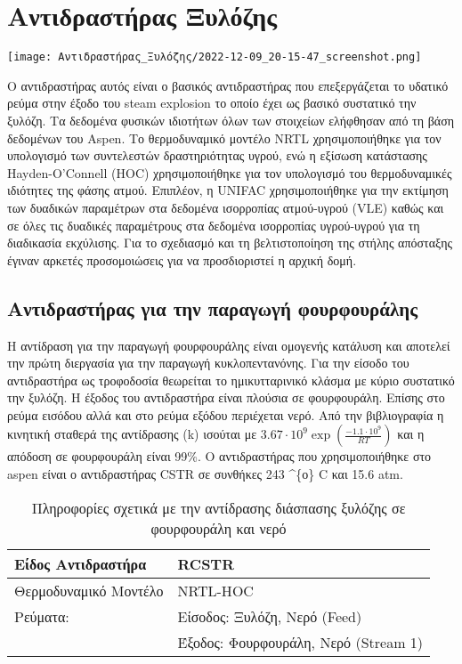 \documentclass[11pt]{article}
\begin{document}
\section{Αντιδραστήρας Ξυλόζης}
\label{sec:orgfaee438}
\begin{center}
\texttt{[image: Αντιδραστήρας\_Ξυλόζης/2022-12-09\_20-15-47\_screenshot.png]}
\end{center}

Ο αντιδραστήρας αυτός είναι ο βασικός αντιδραστήρας που επεξεργάζεται το υδατικό ρεύμα στην έξοδο του steam explosion το οποίο έχει ως βασικό συστατικό την ξυλόζη. Τα δεδομένα φυσικών ιδιοτήτων όλων των στοιχείων ελήφθησαν από τη
βάση δεδομένων του Aspen. Το θερμοδυναμικό μοντέλο ΝRTL χρησιμοποιήθηκε για τον υπολογισμό των συντελεστών δραστηριότητας
υγρού, ενώ η εξίσωση κατάστασης Hayden-O'Connell (HOC) χρησιμοποιήθηκε
για τον υπολογισμό του θερμοδυναμικές ιδιότητες της φάσης ατμού. Επιπλέον, η
UNIFAC χρησιμοποιήθηκε για την εκτίμηση των δυαδικών παραμέτρων
στα δεδομένα ισορροπίας ατμού-υγρού (VLE) καθώς και σε όλες τις δυαδικές παραμέτρους στα δεδομένα ισορροπίας υγρού-υγρού για τη
διαδικασία εκχύλισης. Για το σχεδιασμό και τη βελτιστοποίηση της στήλης
απόσταξης έγιναν αρκετές προσομοιώσεις για να
προσδιοριστεί η αρχική δομή.

\subsection{Αντιδραστήρας για την παραγωγή φουρφουράλης}
\label{sec:orgab91be3}
Η αντίδραση για την παραγωγή φουρφουράλης είναι ομογενής κατάλυση και
αποτελεί την πρώτη διεργασία για την παραγωγή κυκλοπεντανόνης. Για την
είσοδο του αντιδραστήρα ως τροφοδοσία θεωρείται το ημικυτταρινικό κλάσμα
με κύριο συστατικό την ξυλόζη. Η έξοδος του αντιδραστήρα είναι πλούσια
σε φουρφουράλη. Επίσης στο ρεύμα εισόδου αλλά και στο ρεύμα εξόδου
περιέχεται νερό. Από την βιβλιογραφία η κινητική σταθερά της αντίδρασης
(k) ισούται με \(3.67 \cdot 10^9 \exp (\frac{-1.1 \cdot 10^9}{RT})\) \cite{nhienNovelHybridReactive2021} και η απόδοση σε
φουρφουράλη είναι 99\%. Ο αντιδραστήρας που χρησιμοποιήθηκε στο aspen
είναι ο αντιδραστήρας CSTR σε συνθήκες 243 \^{}\{ο\} C και 15.6 atm.

\begin{table}[htbp]
\caption{Πληροφορίες σχετικά με την αντίδρασης διάσπασης ξυλόζης σε φουρφουράλη και νερό}
\centering
\begin{tabular}{ll}
Είδος Αντιδραστήρα & RCSTR\\
\hline
Θερμοδυναμικό Μοντέλο & NRTL-HOC\\
Ρεύματα: & Είσοδος: Ξυλόζη, Νερό (Feed)\\
 & Έξοδος: Φουρφουράλη, Νερό (Stream 1)\\
\end{tabular}
\end{table}
\end{document}
